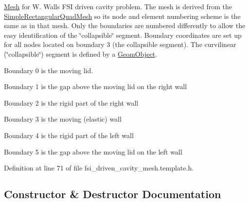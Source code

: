 \hyperlink{classoomph_1_1Mesh}{Mesh} for W. Wall\textquotesingle{}s F\+SI driven cavity problem. The mesh is derived from the {\ttfamily \hyperlink{classoomph_1_1SimpleRectangularQuadMesh}{Simple\+Rectangular\+Quad\+Mesh}} so it\textquotesingle{}s node and element numbering scheme is the same as in that mesh. Only the boundaries are numbered differently to allow the easy identification of the \char`\"{}collapsible\char`\"{} segment. Boundary coordinates are set up for all nodes located on boundary 3 (the collapsible segment). The curvilinear (\char`\"{}collapsible\char`\"{}) segment is defined by a {\ttfamily \hyperlink{classoomph_1_1GeomObject}{Geom\+Object}}. 


\begin{DoxyItemize}
\item Boundary 0 is the moving lid.
\item Boundary 1 is the gap above the moving lid on the right wall
\item Boundary 2 is the rigid part of the right wall
\item Boundary 3 is the moving (elastic) wall
\item Boundary 4 is the rigid part of the left wall
\item Boundary 5 is the gap above the moving lid on the left wall 
\end{DoxyItemize}

Definition at line 71 of file fsi\+\_\+driven\+\_\+cavity\+\_\+mesh.\+template.\+h.



\subsection{Constructor \& Destructor Documentation}
\mbox{\label{classoomph_1_1FSIDrivenCavityMesh_af227477a1de5faf56352d21913a91feb}} 
